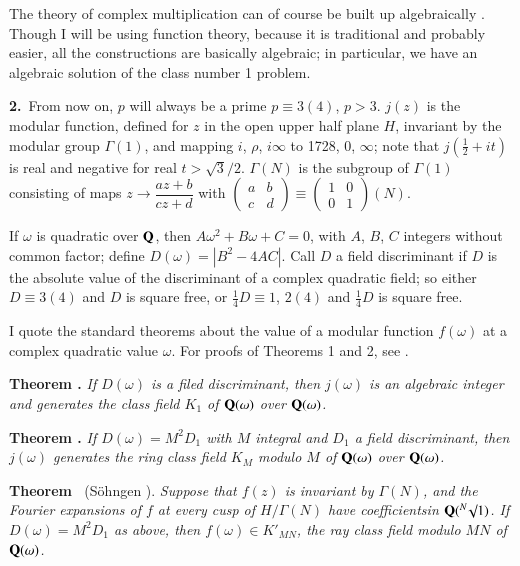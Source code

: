 The theory of complex multiplication can of course be built up algebraically \cite{art03-key3}. Though I will be using function theory, because it is traditional and probably easier, all the constructions are basically algebraic; in particular, we have an algebraic solution of the class number 1 problem.

\medskip
\noindent
{\bf 2.}~From now on, $p$ will always be a prime $p\equiv 3(4)$, $p>3$. $j(z)$ is the modular function, defined for $z$ in the open upper half plane $H$, invariant by the modular group $\Gamma(1)$, and mapping $i$, $\rho$, $i\infty$ to 1728, 0, $\infty$; note that $j(\frac{1}{2}+it)$ is real and negative for real $t>\surd 3/2$. $\Gamma(N)$ is the subgroup of $\Gamma(1)$ consisting of maps $z\to \dfrac{az+b}{cz+d}$ with $\left(\begin{smallmatrix} a & b\\ c & d\end{smallmatrix}\right)\equiv \left(\begin{smallmatrix} 1 & 0\\ 0 & 1\end{smallmatrix}\right)(N)$.

If $\omega$ is quadratic over $\mathbf{Q}$, then $A\omega^{2}+B\omega+C=0$, with $A$, $B$, $C$ integers without common factor; define $D(\omega)=|B^{2}-4AC|$. Call $D$ a field discriminant if $D$ is the absolute value of the discriminant of a complex quadratic field; so either $D\equiv 3(4)$ and $D$ is square free, or $\frac{1}{4}D\equiv 1$, $2(4)$ and $\frac{1}{4}D$ is square free.

I quote the standard theorems about the value of a modular function $f(\omega)$ at a complex quadratic value $\omega$. For proofs of Theorems 1 and 2, see \cite{art03-key3}.

\medskip
\noindent
{\bf Theorem .\label{art03-thm1}}
{\em If $D(\omega)$ is a filed discriminant, then $j(\omega)$ is an algebraic integer and generates the class field $K_{1}$ of $\mathbf{Q}(\omega)$ over $\mathbf{Q}(\omega)$.}

\medskip
\noindent
{\bf Theorem .\label{art03-thm2}}
{\em If $D(\omega)=M^{2}D_{1}$ with $M$ integral and $D_{1}$ a field discriminant, then $j(\omega)$ generates the ring class field $K_{M}$ modulo $M$ of $\mathbf{Q}(\omega)$ over $\mathbf{Q}(\omega)$.}

\medskip
\noindent
{\bf Theorem \label{art03-thm3}}~(S\"ohngen \cite{art03-key6}).
{\em Suppose that $f(z)$ is invariant by $\Gamma(N)$, and the Fourier expansions of $f$ at every cusp of $H/\Gamma(N)$ have coefficients\pageoriginale in $\mathbf{Q}({}^{N}\surd 1)$. If $D(\omega)=M^{2}D_{1}$ as above, then $f(\omega)\in K'_{MN}$, the ray class field modulo $MN$ of $\mathbf{Q}(\omega)$.}


